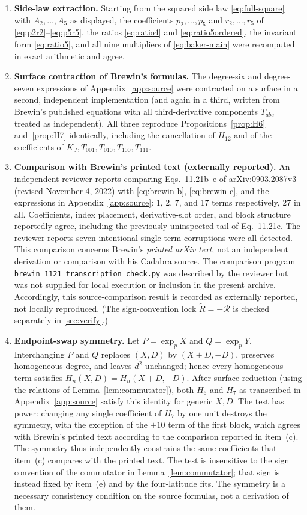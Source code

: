 \documentclass[11pt]{amsart}
\numberwithin{equation}{section}
\theoremstyle{remark}
\newcommand{\Riem}{\mathcal{R}}
\newcommand{\BRiem}{\widetilde{R}}
\begin{document}
\begin{enumerate}[leftmargin=2em,label=(\alph*)]
\item \textbf{Side-law extraction.} Starting from the squared side law \eqref{eq:full-square} with $A_2,\dots,A_5$ as displayed, the coefficients $p_2,\dots,p_5$ and $r_2,\dots,r_5$ of \eqref{eq:p2r2}--\eqref{eq:p5r5}, the ratios \eqref{eq:ratio4} and \eqref{eq:ratio5ordered}, the invariant form \eqref{eq:ratio5}, and all nine multipliers of \eqref{eq:baker-main} were recomputed in exact arithmetic and agree.
\item \textbf{Surface contraction of Brewin's formulas.} The degree-six and degree-seven expressions of Appendix~\ref{app:source} were contracted on a surface in a second, independent implementation (and again in a third, written from Brewin's published equations with all third-derivative components $T_{abc}$ treated as independent). All three reproduce Propositions~\ref{prop:H6} and~\ref{prop:H7} identically, including the cancellation of $H_{12}$ and of the coefficients of $K_J,T_{001},T_{010},T_{100},T_{111}$.
\item \textbf{Comparison with Brewin's printed text (externally reported).} An independent reviewer reports comparing Eqs.~11.21b--e of arXiv:0903.2087v3 (revised November 4, 2022) with \eqref{eq:brewin-b}, \eqref{eq:brewin-c}, and the expressions in Appendix~\ref{app:source}: 1, 2, 7, and 17 terms respectively, 27 in all. Coefficients, index placement, derivative-slot order, and block structure reportedly agree, including the previously uninspected tail of Eq.~11.21e. The reviewer reports seven intentional single-term corruptions were all detected. This comparison concerns Brewin's \emph{printed arXiv text}, not an independent derivation or comparison with his Cadabra source. The comparison program \texttt{brewin\_1121\_transcription\_check.py} was described by the reviewer but was not supplied for local execution or inclusion in the present archive. Accordingly, this source-comparison result is recorded as externally reported, not locally reproduced. (The sign-convention lock $\BRiem=-\Riem$ is checked separately in \cref{sec:verify}.)
\item \textbf{Endpoint-swap symmetry.} Let $P=\exp_pX$ and $Q=\exp_pY$. Interchanging $P$ and $Q$ replaces $(X,D)$ by $(X+D,-D)$, preserves homogeneous degree, and leaves $d^2$ unchanged; hence every homogeneous term satisfies $H_n(X,D)=H_n(X+D,-D)$. After surface reduction (using the relations of Lemma~\ref{lem:commutator}), both $H_6$ and $H_7$ as transcribed in Appendix~\ref{app:source} satisfy this identity for generic $X,D$. The test has power: changing any single coefficient of $H_7$ by one unit destroys the symmetry, with the exception of the $+10$ term of the first block, which agrees with Brewin's printed text according to the comparison reported in item~(c). The symmetry thus independently constrains the same coefficients that item~(c) compares with the printed text. The test is insensitive to the sign convention of the commutator in Lemma~\ref{lem:commutator}; that sign is instead fixed by item~(e) and by the four-latitude fits. The symmetry is a necessary consistency condition on the source formulas, not a derivation of them.

\end{enumerate}
\end{document}
